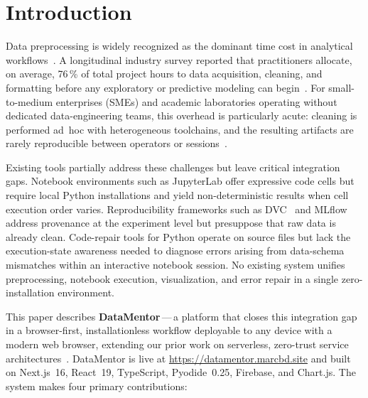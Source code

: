 \documentclass[conference]{IEEEtran}
\begin{document}
\section{Introduction}
\label{sec:intro}

Data preprocessing is widely recognized as the dominant time cost in
analytical workflows~\cite{krishnan2016}. A longitudinal industry
survey reported that practitioners allocate, on average, 76\,\% of
total project hours to data acquisition, cleaning, and formatting
before any exploratory or predictive modeling can
begin~\cite{crowdflower2016}. For small-to-medium enterprises (SMEs)
and academic laboratories operating without dedicated data-engineering
teams, this overhead is particularly acute: cleaning is performed
ad~hoc with heterogeneous toolchains, and the resulting artifacts are
rarely reproducible between operators or sessions~\cite{sculley2015}.

Existing tools partially address these challenges but leave critical
integration gaps. Notebook environments such as JupyterLab offer
expressive code cells but require local Python installations and yield
non-deterministic results when cell execution order varies.
Reproducibility frameworks such as DVC~\cite{dvc2020} and
MLflow~\cite{mlflow2018} address provenance at the experiment level
but presuppose that raw data is already clean. Code-repair tools for
Python operate on source files but lack the execution-state awareness
needed to diagnose errors arising from data-schema mismatches within
an interactive notebook session. No existing system unifies
preprocessing, notebook execution, visualization, and error repair in
a single zero-installation environment.

This paper describes \textbf{DataMentor}\,---\,a platform that closes
this integration gap in a browser-first, installationless workflow
deployable to any device with a modern web browser, extending our
prior work on serverless, zero-trust service
architectures~\cite{chowdhury2025serverless}. DataMentor is
live at \url{https://datamentor.marcbd.site} and built on Next.js~16,
React~19, TypeScript, Pyodide~0.25, Firebase, and Chart.js. The
system makes four primary contributions:
\end{document}

